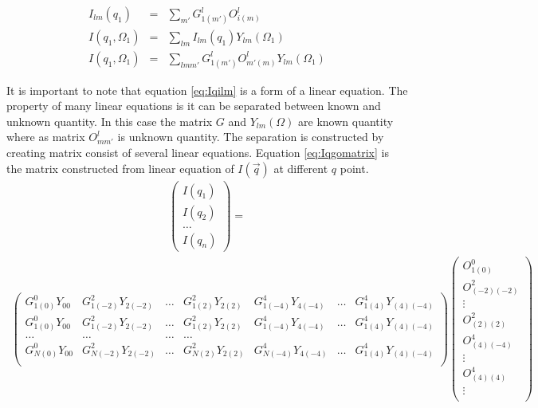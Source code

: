 \begin{eqnarray}
I_{lm}(q_{1})&=&\sum_{m'} G^{l}_{1(m')} O^{l}_{i(m)} \\
I(q_{1},\Omega_{1})&=&\sum_{lm} I_{lm}(q_{1}) Y_{lm}(\Omega_{1}) \\
I(q_{1},\Omega_{1})&=&\sum_{lmm'} G^{l}_{1(m')} O^{l}_{m'(m)} Y_{lm}(\Omega_{1})  
\label{eq:Iqilm}
\end{eqnarray}

It is important to note that equation \ref{eq:Iqilm} is a form of a linear equation. The property of many linear equations is it can be separated between known and unknown quantity. In this case the matrix $G$ and $Y_{lm}(\Omega)$ are known quantity where as matrix $O^{l}_{mm'}$ is unknown quantity. The separation is constructed by creating matrix consist of several linear equations. Equation \ref{eq:Iqgomatrix} is the matrix constructed from linear equation of $I(\vec{q})$ at different $q$ point.  
\begin{eqnarray}
\begin{pmatrix}
I(q_{1}) \\
I(q_{2}) \\
\ldots \\
I(q_{n}) 
\end{pmatrix}
\label{eq:Iqgomatrix}
= 
\end{eqnarray}
\begin{eqnarray*}
\begin{pmatrix}
G^{0}_{1(0)} Y_{00} & G^{2}_{1(-2)} Y_{2(-2)} & \ldots & G^{2}_{1(2)} Y_{2(2)} & G^{4}_{1(-4)} Y_{4(-4)} & \dots  & G^{4}_{1(4)}Y_{(4)(-4)} \\
G^{0}_{1(0)} Y_{00} & G^{2}_{1(-2)} Y_{2(-2)} & \ldots & G^{2}_{1(2)} Y_{2(2)} & G^{4}_{1(-4)} Y_{4(-4)} & \dots  & G^{4}_{1(4)}Y_{(4)(-4)} \\
\ldots & \ldots & \ldots & \ldots & \\
G^{0}_{N(0)} Y_{00} & G^{2}_{N(-2)} Y_{2(-2)} & \ldots & G^{2}_{N(2)} Y_{2(2)} & G^{4}_{N(-4)} Y_{4(-4)} & \dots  & G^{4}_{1(4)}Y_{(4)(-4)} \\
\end{pmatrix}
\begin{pmatrix}
O^{0}_{1(0)} \\
O^{2}_{(-2)(-2)} \\
\vdots \\
O^{2}_{(2)(2)} \\
O^{4}_{(4)(-4)} \\
\vdots \\
O^{4}_{(4)(4)} \\
\vdots \\
\end{pmatrix}
\end{eqnarray*}

